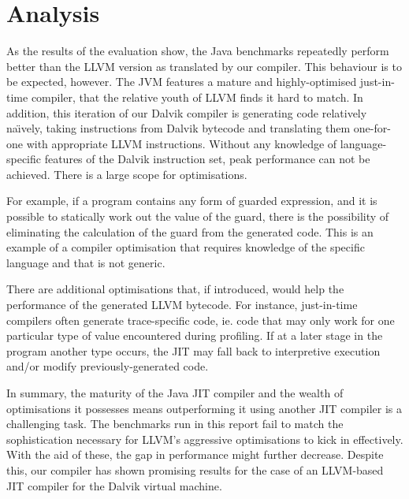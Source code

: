 \section{Analysis}
\label{sec:analysis}

As the results of the evaluation show, the Java benchmarks repeatedly perform better than the LLVM version as translated by our compiler. This behaviour is to be expected, however. The JVM features a mature and highly-optimised just-in-time compiler, that the relative youth of LLVM finds it hard to match. In addition, this iteration of our Dalvik compiler is generating code relatively na\"{\i}vely, taking instructions from Dalvik bytecode and translating them one-for-one with appropriate LLVM instructions. Without any knowledge of language-specific features of the Dalvik instruction set, peak performance can not be achieved. There is a large scope for optimisations.

For example, if a program contains any form of guarded expression, and it is possible to statically work out the value of the guard, there is the possibility of eliminating the calculation of the guard from the generated code. This is an example of a compiler optimisation that requires knowledge of the specific language and that is not generic.

There are additional optimisations that, if introduced, would help the performance of the generated LLVM bytecode. For instance, just-in-time compilers often generate trace-specific code, ie. code that may only work for one particular type of value encountered during profiling. If at a later stage in the program another type occurs, the JIT may fall back to interpretive execution and/or modify previously-generated code.

In summary, the maturity of the Java JIT compiler and the wealth of optimisations it possesses means outperforming it using another JIT compiler is a challenging task. The benchmarks run in this report fail to match the sophistication necessary for LLVM's aggressive optimisations to kick in effectively. With the aid of these, the gap in performance might further decrease. Despite this, our compiler has shown promising results for the case of an LLVM-based JIT compiler for the Dalvik virtual machine.
